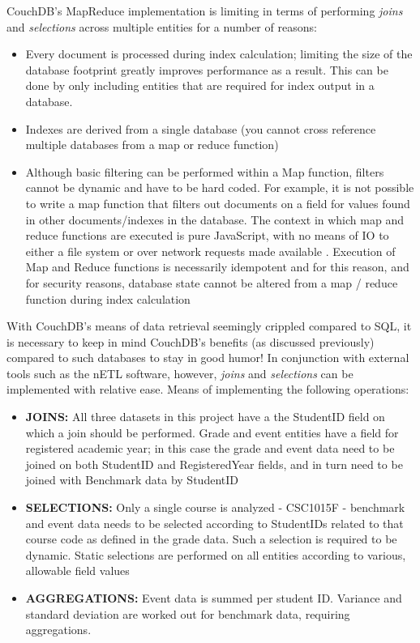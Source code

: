\label{chapter-analysis}
CouchDB's MapReduce implementation is limiting in terms of performing \textit{joins} and \textit{selections} across multiple entities for a number of reasons:

\begin{itemize}
    \item Every document is processed during index calculation; limiting the size of the database footprint greatly improves performance as a result. This can be done by only including entities that are required for index output in a database.
    \item Indexes are derived from a single database (you cannot cross reference multiple databases from a map or reduce function)
    \item Although basic filtering can be performed within a Map function, filters cannot be dynamic and have to be hard coded. For example, it is not possible to write a map function that filters out documents on a field for values found in other documents/indexes in the database. The context in which map and reduce functions are executed is pure JavaScript, with no means of IO to either a file system or over network requests made available \cite{slack28Feb}. Execution of Map and Reduce functions is necessarily idempotent and for this reason, and for security reasons, database state cannot be altered from a map / reduce function during index calculation
\end{itemize}

With CouchDB's means of data retrieval seemingly crippled compared to SQL, it is necessary to keep in mind CouchDB's benefits (as discussed previously) compared to such databases to stay in good humor! In conjunction with external tools such as the nETL software, however, \textit{joins} and \textit{selections} can be implemented with relative ease. Means of implementing the following operations:

\begin{itemize}
    \item \textbf{JOINS:} All three datasets in this project have a the StudentID field on which a join should be performed. Grade and event entities have a field for registered academic year; in this case the grade and event data need to be joined on both StudentID and RegisteredYear fields, and in turn need to be joined with Benchmark data by StudentID
    \item \textbf{SELECTIONS:} Only a single course is analyzed - CSC1015F - benchmark and event data needs to be selected according to StudentIDs related to that course code as defined in the grade data. Such a selection is required to be dynamic. Static selections are performed on all entities according to various, allowable field values
    \item \textbf{AGGREGATIONS:} Event data is summed per student ID. Variance and standard deviation are worked out for benchmark data, requiring aggregations.
\end{itemize}


